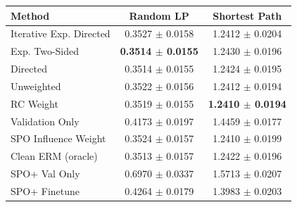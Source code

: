 \begin{tabular}{lcc}
\toprule
Method & Random LP & Shortest Path \\
\midrule
Iterative Exp. Directed & 0.3527 $\pm$ 0.0158 & 1.2412 $\pm$ 0.0204 \\
Exp. Two-Sided & \textbf{0.3514 $\pm$ 0.0155} & 1.2430 $\pm$ 0.0196 \\
Directed & 0.3514 $\pm$ 0.0155 & 1.2424 $\pm$ 0.0195 \\
Unweighted & 0.3522 $\pm$ 0.0156 & 1.2412 $\pm$ 0.0194 \\
RC Weight & 0.3519 $\pm$ 0.0155 & \textbf{1.2410 $\pm$ 0.0194} \\
Validation Only & 0.4173 $\pm$ 0.0197 & 1.4459 $\pm$ 0.0177 \\
SPO Influence Weight & 0.3524 $\pm$ 0.0157 & 1.2410 $\pm$ 0.0199 \\
Clean ERM (oracle) & 0.3513 $\pm$ 0.0157 & 1.2422 $\pm$ 0.0196 \\
SPO+ Val Only & 0.6970 $\pm$ 0.0337 & 1.5713 $\pm$ 0.0207 \\
SPO+ Finetune & 0.4264 $\pm$ 0.0179 & 1.3983 $\pm$ 0.0203 \\
\bottomrule
\end{tabular}
